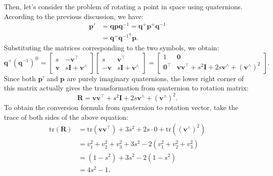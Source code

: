 Then, let's consider the problem of rotating a point in space using quaternions. According to the previous discussion, we have:
\begin{equation}\label{eq:quaternion-to-rotation-matrix-derive}
	\begin{split}
		\mathbf{p}' &= \mathbf{q} \mathbf{p} \mathbf{q}^{-1} = \mathbf{q}^+ \mathbf{p}^+ \mathbf{q}^{-1} \\
		&= \mathbf{q}^+ \mathbf{q}^{{-1}^{\oplus}} \mathbf{p}.
	\end{split}
\end{equation}
Substituting the matrices corresponding to the two symbols, we obtain:
\begin{equation}
	{\mathbf{q}^ + }{\left( {{\mathbf{q}^{ - 1}}} \right)^ \oplus } = \left[ \begin{array}{*{20}{c}}
		s&-\mathbf{v}^\top\\
		\mathbf{v}&s\mathbf{I}+\mathbf{v}^\wedge 
	\end{array} \right]\left[\begin{array}{*{20}{c}}
		s&{\mathbf{v} ^\top}\\
		{ - \mathbf{v} }&{s\mathbf{I} + \mathbf{v} ^ \wedge }
	\end{array} \right] = \left[ \begin{array}{*{20}{c}}
		1&\mathbf{0} \\
		\mathbf{0}^\top&\mathbf{v}\mathbf{v}^\top + {s^2} \mathbf{I} + 2s\mathbf{v} ^ \wedge + {(\mathbf{v} ^ 
			\wedge)}^2 
	\end{array} \right].
\end{equation}
Since both $\mathbf{p}'$ and $\mathbf{p}$ are purely imaginary quaternions, the lower right corner of this matrix actually gives the transformation from quaternion to rotation matrix:
\begin{equation}
	\mathbf{R} = \mathbf{v} \mathbf{v}^\top + {s^2} \mathbf{I} + 2s\mathbf{v} ^ \wedge + {(\mathbf{v} ^ \wedge)}^2.
\end{equation}
To obtain the conversion formula from quaternion to rotation vector, take the trace of both sides of the above equation:
\begin{equation}
	\begin{aligned}
		\mathrm{tr}(\mathbf{R}) &= \mathrm{tr}(\mathbf{v}\mathbf{v}^\top) + 3s^2 + 2s \cdot 0 + 
		\mathrm{tr}((\mathbf{v}^\wedge)^2) \\
		&= v_1^2+v_2^2+v_3^2 + 3s^2 - 2(v_1^2+v_2^2+v_3^2) \\
		&= (1-s^2) + 3s^2 -2(1-s^2)\\
		&= 4s^2 -1.
	\end{aligned}
\end{equation}
